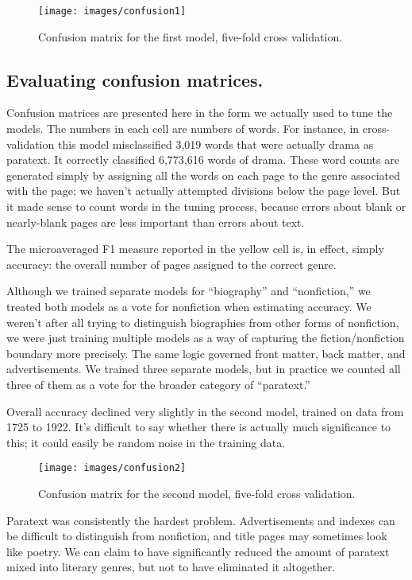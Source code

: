 \documentclass[paper=a4, fontsize=12pt]{scrartcl}
\numberwithin{equation}{section}		%
\numberwithin{figure}{section}			%
\numberwithin{table}{section}				%
\begin{document}
\begin{figure}[!h]
\centering
\texttt{[image: images/confusion1]}
\caption{Confusion matrix for the first model, five-fold cross validation.}
\label{confusion1}
\end{figure}

\subsection{Evaluating confusion matrices.}
Confusion matrices are presented here in the form we actually used to tune the models. The numbers in each cell are numbers of words. For instance, in cross-validation this model misclassified 3,019 words that were actually drama as paratext. It correctly classified 6,773,616 words of drama. These word counts are generated simply by assigning all the words on each page to the genre associated with the page; we haven't actually attempted divisions below the page level. But it made sense to count words in the tuning process, because errors about blank or nearly-blank pages are less important than errors about text.

The microaveraged F1 measure reported in the yellow cell is, in effect, simply accuracy: the overall number of pages assigned to the correct genre.

Although we trained separate models for ``biography'' and ``nonfiction,'' we treated both models as a vote for nonfiction when estimating accuracy. We weren't after all trying to distinguish biographies from other forms of nonfiction, we were just training multiple models as a way of capturing the fiction/nonfiction boundary more precisely. The same logic governed front matter, back matter, and advertisements. We trained three separate models, but in practice we counted all three of them as a vote for the broader category of ``paratext.''

Overall accuracy declined very slightly in the second model, trained on data from 1725 to 1922. It's difficult to say whether there is actually much significance to this; it could easily be random noise in the training data.

\begin{figure}[!h]
\centering
\texttt{[image: images/confusion2]}
\caption{Confusion matrix for the second model, five-fold cross validation.}
\label{confusion2}
\end{figure}

Paratext was consistently the hardest problem. Advertisements and indexes can be difficult to distinguish from nonfiction, and title pages may sometimes look like poetry. We can claim to have significantly reduced the amount of paratext mixed into literary genres, but not to have eliminated it altogether.
\end{document}

